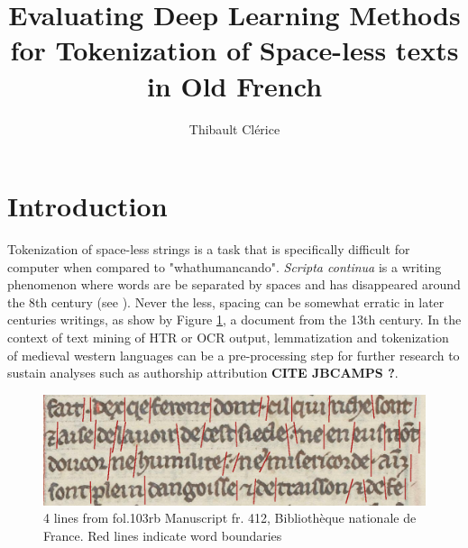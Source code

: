 \documentclass{jdmdh}
\title{Evaluating Deep Learning Methods for Tokenization of Space-less texts in Old French}
\author[1]{Thibault Clérice}
\affil[1]{École nationale des Chartes, France}
\affil[2]{Université Lyon 3, France}
\begin{document}
\maketitle



\section{Introduction}


Tokenization of space-less strings is a task that is specifically difficult for computer when compared to "whathumancando". \textit{Scripta continua} is a writing phenomenon where words are be separated by spaces and has disappeared around the 8th century (see \citet{zanna1998lecture}). Never the less, spacing can be somewhat erratic in later centuries writings, as show by Figure \ref{fig:4lines}, a document from the 13th century. In the context of text mining of HTR or OCR output, lemmatization and tokenization of medieval western languages can be a pre-processing step for further research to sustain analyses such as authorship attribution \textbf{CITE JBCAMPS ?}.

\begin{figure}[!ht]
  \centering
  \includegraphics[width=\linewidth]{4-lines-p0215.png}

  \caption{ 4 lines from fol.103rb Manuscript fr. 412, Bibliothèque nationale de France.  Red lines indicate word boundaries}
  \label{fig:4lines}
\end{figure}
\end{document}
